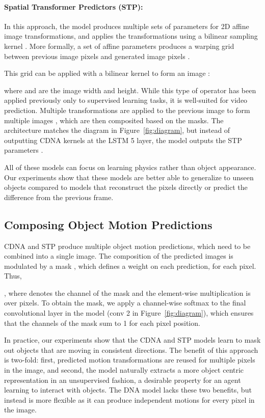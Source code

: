 \documentclass{article}
\begin{document}
\vspace{-0.07in}
\paragraph{Spatial Transformer Predictors (STP):}
In this approach, the model produces multiple sets of parameters for 2D affine image transformations, and applies the transformations using
a bilinear sampling kernel \cite{jsz-stn-15}. More formally, a set of affine parameters  produces a warping grid between previous image pixels 
and generated image pixels .

This grid can be applied with a bilinear kernel to form an image :
\vspace{-0.1cm}

where  and  are the image width and height.
While this type of operator has been applied previously only to supervised learning tasks, it is well-suited for video prediction.
Multiple transformations  are applied to the previous image  to form multiple images ,
which are then composited based on the masks. The architecture matches the diagram in Figure~\ref{fig:diagram},
but instead of outputting CDNA kernels at the LSTM 5 layer, the model outputs the STP parameters .

All of these models can
focus on learning physics rather than object appearance. Our experiments show that these models
are better able to generalize to unseen objects compared to models that reconstruct the pixels directly or predict the difference from the previous frame.


\subsection{Composing Object Motion Predictions}

CDNA and STP produce multiple object motion predictions, which need to be combined into a single image.
The composition of the predicted images  is modulated by a mask , which defines a weight on each prediction, for each pixel.
Thus,

, where  denotes the channel of the mask and the element-wise multiplication is over pixels.
To obtain the mask, we apply a channel-wise softmax to the final convolutional layer in the model (conv 2 in Figure~\ref{fig:diagram}),
which ensures that the channels of the mask sum to 1 for each pixel position.



In practice, our
experiments show that the CDNA and STP models learn to mask out objects that are moving in consistent directions.
The benefit of this approach is two-fold: first, predicted motion transformations are reused
for multiple pixels in the image, and second, the model naturally extracts a more object centric representation in an unsupervised fashion, a desirable
property for an agent learning to interact with objects. The DNA model lacks these two benefits, but instead is more flexible
as it can produce independent motions for every pixel in the image.
\end{document}
